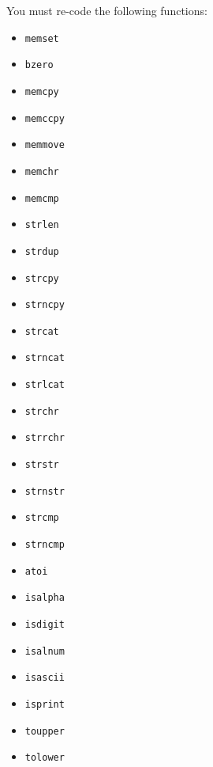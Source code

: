 \documentclass{42-en}
\begin{document}

        You must re-code the following functions:

        \vspace{5mm}
        \begin{itemize}\itemsep1mm

            \item \texttt{memset}
            \item \texttt{bzero}
            \item \texttt{memcpy}
            \item \texttt{memccpy}
            \item \texttt{memmove}
            \item \texttt{memchr}
            \item \texttt{memcmp}
            \item \texttt{strlen}
            \item \texttt{strdup}
            \item \texttt{strcpy}
            \item \texttt{strncpy}
            \item \texttt{strcat}
            \item \texttt{strncat}
            \item \texttt{strlcat}
            \item \texttt{strchr}
            \item \texttt{strrchr}
            \item \texttt{strstr}
            \item \texttt{strnstr}
            \item \texttt{strcmp}
            \item \texttt{strncmp}
            \item \texttt{atoi}
            \item \texttt{isalpha}
            \item \texttt{isdigit}
            \item \texttt{isalnum}
            \item \texttt{isascii}
            \item \texttt{isprint}
            \item \texttt{toupper}
            \item \texttt{tolower}

        \end{itemize}
\end{document}
